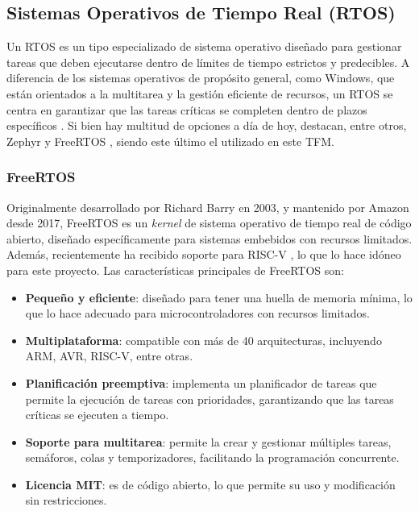 \subsection{Sistemas Operativos de Tiempo Real (RTOS)}
\label{st:rtos}
Un RTOS es un tipo especializado de sistema operativo diseñado para gestionar tareas que deben ejecutarse dentro de límites de tiempo estrictos y predecibles. A diferencia de los sistemas operativos de propósito general, como Windows, que están orientados a la multitarea y la gestión eficiente de recursos, un RTOS se centra en garantizar que las tareas críticas se completen dentro de plazos específicos \cite{rtosInfo} \cite{rtosInfo_2}. Si bien hay multitud de opciones a día de hoy, destacan, entre otros, Zephyr \cite{zephyrInfo} y FreeRTOS \cite{freeRTOSInfo}, siendo este último el utilizado en este \ac{TFM}.

\subsubsection{FreeRTOS}
\label{st:freertos}
Originalmente desarrollado por Richard Barry en 2003, y mantenido por Amazon desde 2017, FreeRTOS es un \textit{kernel} de sistema operativo de tiempo real de código abierto, diseñado específicamente para sistemas embebidos con recursos limitados. Además, recientemente ha recibido soporte para RISC-V \cite{soporteRISCVFreeRTOS}, lo que lo hace idóneo para este proyecto. Las características principales de FreeRTOS son:

\begin{itemize}
    \item \textbf{Pequeño y eficiente}: diseñado para tener una huella de memoria mínima, lo que lo hace adecuado para microcontroladores con recursos limitados.
    \item \textbf{Multiplataforma}: compatible con más de 40 arquitecturas, incluyendo ARM, AVR, RISC-V, entre otras.
    \item \textbf{Planificación preemptiva}: implementa un planificador de tareas que permite la ejecución de tareas con prioridades, garantizando que las tareas críticas se ejecuten a tiempo.
    \item \textbf{Soporte para multitarea}: permite la crear y gestionar múltiples tareas, semáforos, colas y temporizadores, facilitando la programación concurrente.
    \item \textbf{Licencia MIT}: es de código abierto, lo que permite su uso y modificación sin restricciones.
\end{itemize}

